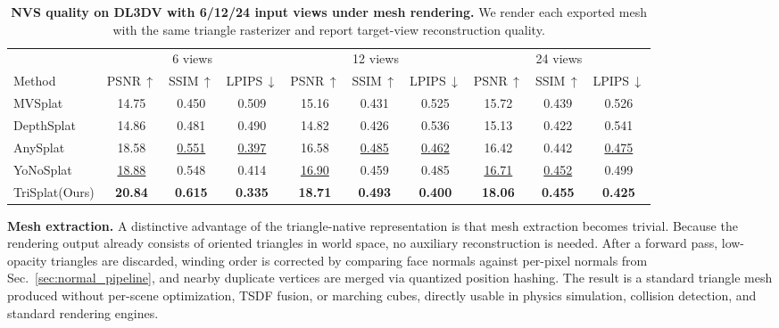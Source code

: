 \documentclass{llmxive}
\providecommand{\method}{TriSplat\xspace}
\providecommand{\boldstart}[1]{\vspace{0.1in}\noindent\textbf{#1}}
\providecommand{\arraystretch}{0.94}
\begin{document}
\begin{table}[t]
\centering
{\footnotesize
\setlength{\tabcolsep}{3.8pt}
\renewcommand{\arraystretch}{0.94}
\begin{tabular*}{0.96\textwidth}{@{\extracolsep{\fill}}l|ccc|ccc|ccc@{}}
\toprule
& \multicolumn{3}{c|}{6 views} & \multicolumn{3}{c|}{12 views} & \multicolumn{3}{c}{24 views} \\
Method & PSNR\,$\uparrow$ & SSIM\,$\uparrow$ & LPIPS\,$\downarrow$ & PSNR\,$\uparrow$ & SSIM\,$\uparrow$ & LPIPS\,$\downarrow$ & PSNR\,$\uparrow$ & SSIM\,$\uparrow$ & LPIPS\,$\downarrow$ \\
\midrule
MVSplat    & 14.75 & 0.450 & 0.509 & 15.16 & 0.431 & 0.525 & 15.72 & 0.439 & 0.526 \\
DepthSplat & 14.86 & 0.481 & 0.490 & 14.82 & 0.426 & 0.536 & 15.13 & 0.422 & 0.541 \\
AnySplat   & 18.58 & \underline{0.551} & \underline{0.397} & 16.58 & \underline{0.485} & \underline{0.462} & 16.42 & 0.442 & \underline{0.475} \\
YoNoSplat  & \underline{18.88} & 0.548 & 0.414 & \underline{16.90} & 0.459 & 0.485 & \underline{16.71} & \underline{0.452} & 0.499 \\
\midrule
\method (Ours) & \textbf{20.84} & \textbf{0.615} & \textbf{0.335} & \textbf{18.71} & \textbf{0.493} & \textbf{0.400} & \textbf{18.06} & \textbf{0.455} & \textbf{0.425} \\
\bottomrule
\end{tabular*}
}
\caption{\textbf{NVS quality on DL3DV with 6/12/24 input views under mesh rendering.} We render each exported mesh with the same triangle rasterizer and report target-view reconstruction quality.}
\label{tab:main_dl3dv_nvs}
\end{table}

\boldstart{Mesh extraction.}
A distinctive advantage of the triangle-native representation is that mesh extraction becomes trivial. Because the rendering output already consists of oriented triangles in world space, no auxiliary reconstruction is needed. After a forward pass, low-opacity triangles are discarded, winding order is corrected by comparing face normals against per-pixel normals from Sec.~\ref{sec:normal_pipeline}, and nearby duplicate vertices are merged via quantized position hashing. The result is a standard triangle mesh produced without per-scene optimization, TSDF fusion, or marching cubes, directly usable in physics simulation, collision detection, and standard rendering engines.
\end{document}
